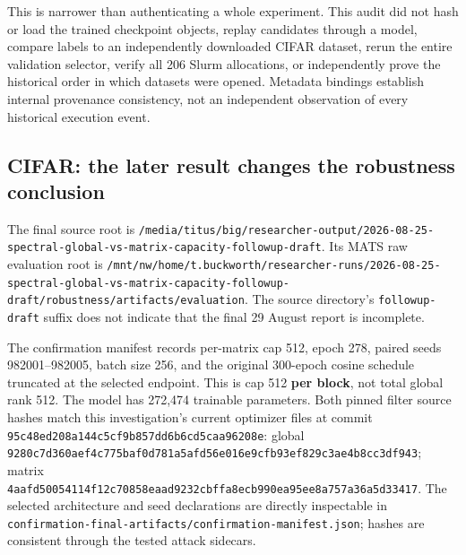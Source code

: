 \documentclass[
  british,
  10pt,
  a4paper,
]{article}
\begin{document}
This is narrower than authenticating a whole experiment.\allowbreak{}
This audit did not hash or load the trained checkpoint objects, replay
candidates through a model, compare labels to an independently
downloaded CIFAR dataset, rerun the entire validation selector, verify
all 206 Slurm allocations,\allowbreak{} or independently prove the
historical order in which datasets were opened. Metadata bindings
establish internal provenance consistency,\allowbreak{} not an
independent observation of every historical execution event.

\subsection{CIFAR: the later result changes the robustness
conclusion}\label{external-results-audit--cifar-the-later-result-changes-the-robustness-conclusion}

The final source root is
\texttt{/\allowbreak{}media/\allowbreak{}titus/\allowbreak{}big/\allowbreak{}researcher-\allowbreak{}output/\allowbreak{}2026-\allowbreak{}08-\allowbreak{}25-\allowbreak{}spectral-\allowbreak{}global-\allowbreak{}vs-\allowbreak{}matrix-\allowbreak{}capacity-\allowbreak{}followup-\allowbreak{}draft}.
Its MATS raw evaluation root is
\texttt{/\allowbreak{}mnt/\allowbreak{}nw/\allowbreak{}home/\allowbreak{}t.\allowbreak{}buckworth/\allowbreak{}researcher-\allowbreak{}runs/\allowbreak{}2026-\allowbreak{}08-\allowbreak{}25-\allowbreak{}spectral-\allowbreak{}global-\allowbreak{}vs-\allowbreak{}matrix-\allowbreak{}capacity-\allowbreak{}followup-\allowbreak{}draft/\allowbreak{}robustness/\allowbreak{}artifacts/\allowbreak{}evaluation}.
The source directory's \texttt{followup-\allowbreak{}draft} suffix does
not indicate that the final 29 August report is incomplete.\allowbreak{}

The confirmation manifest records per-matrix cap 512, epoch 278, paired
seeds 982001–98200\allowbreak{}5,\allowbreak{} batch size 256, and the
original 300-epoch cosine schedule truncated at the selected endpoint.
This is cap 512 \textbf{per block}, not total global rank 512. The model
has 272,474 trainable parameters.\allowbreak{} Both pinned filter source
hashes match this investigation's current optimizer files at commit
\texttt{95c48ed208a1\allowbreak{}44c5cf9b857d\allowbreak{}d6b6cd5caa96\allowbreak{}208e}:
global
\texttt{9280c7d360ae\allowbreak{}f4c775baf0d7\allowbreak{}81a5afd56e01\allowbreak{}6e9cfb93ef82\allowbreak{}9c3ae4b8cc3d\allowbreak{}f943};
matrix
\texttt{4aafd5005411\allowbreak{}4f12c70858ea\allowbreak{}ad9232cbffa8\allowbreak{}ecb990ea95ee\allowbreak{}8a757a36a5d3\allowbreak{}3417}.
The selected architecture and seed declarations are directly inspectable
in
\texttt{confirmation\allowbreak{}-\allowbreak{}final-\allowbreak{}artifacts/\allowbreak{}confirmation\allowbreak{}-\allowbreak{}manifest.\allowbreak{}json};
hashes are consistent through the tested attack sidecars.
\end{document}
